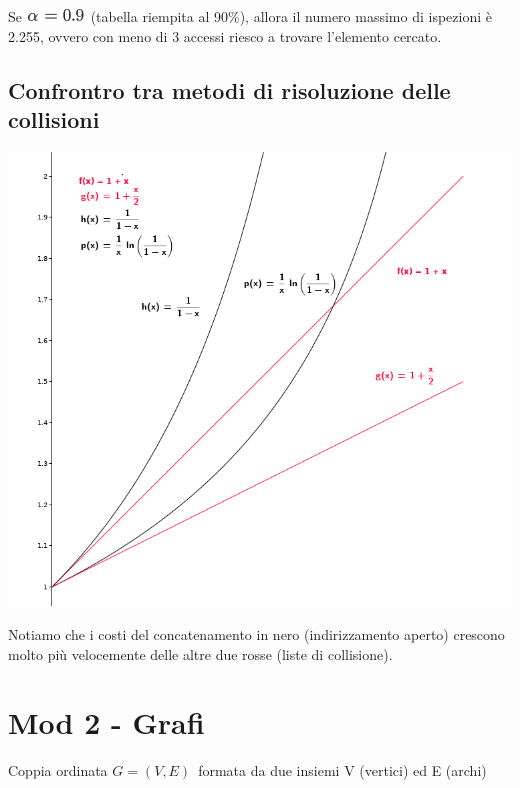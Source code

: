 \documentclass{article}
\begin{document}
{Se }\includegraphics{images/image331.png}{~(tabella riempita al 90\%),
allora il numero massimo di ispezioni è 2.255, ovvero con meno di 3
accessi riesco a trovare l'elemento cercato.}

{}

\hypertarget{h.sg1b57l388xe}{\subsection{\texorpdfstring{{Confrontro tra
metodi di risoluzione delle
collisioni}}{Confrontro tra metodi di risoluzione delle collisioni}}\label{h.sg1b57l388xe}}

{\includegraphics{images/image541.png}}

{}

{Notiamo che i costi del concatenamento in nero (indirizzamento aperto)
crescono molto più velocemente delle altre due rosse (liste di
collisione).}

\hypertarget{h.fi9e3nt34nfb}{\section{\texorpdfstring{{Mod 2 -
}{Grafi}}{Mod 2 - Grafi}}\label{h.fi9e3nt34nfb}}

{Coppia ordinata }$G=(V,E)${~formata da due
insiemi V (vertici) ed E (archi)}
\end{document}

